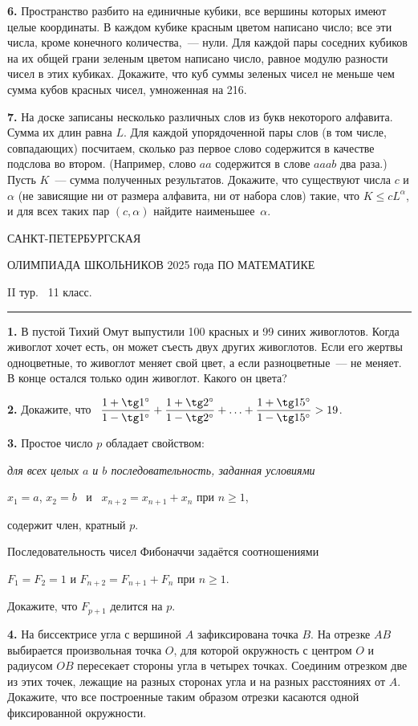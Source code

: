 \documentclass[12pt]{article}
\def\q#1.{{\bf #1. }}
\begin{document}
\q6. Пространство разбито на единичные кубики, все вершины которых имеют целые координаты. В каждом кубике красным
цветом написано число; все эти числа, кроме конечного количества,~--- нули. 
Для каждой пары соседних кубиков на их общей грани зеленым цветом
написано число, равное модулю разности чисел в этих кубиках. Докажите, что
куб суммы зеленых чисел не меньше чем сумма кубов красных чисел, умноженная на 216. 

\q7. На доске записаны несколько различных слов из букв некоторого алфавита.
Сумма их длин равна $L$. Для каждой упорядоченной пары слов (в том числе,
совпадающих) посчитаем, сколько раз первое слово содержится в качестве
подслова во втором. (Например, слово $aa$ содержится в слове $aaab$ два
раза.) Пусть $K$~--- сумма полученных результатов. Докажите, что
существуют числа $c$ и $\alpha$ (не зависящие ни от размера алфавита, ни
от набора слов) такие, что $K\leq cL^\alpha$, и для всех таких пар $(c,\alpha)$ найдите наименьшее~$\alpha$. 


\clearpage

\centerline{\sc САНКТ-ПЕТЕРБУРГСКАЯ}
\centerline{\sc ОЛИМПИАДА ШКОЛЬНИКОВ 2025 года ПО МАТЕМАТИКЕ}
\centerline{\sc II тур. \ 11 класс.}
\medskip
\hrule
\bigskip

\q1. В пустой Тихий Омут выпустили 100 красных и 99 синих живоглотов.
Когда живоглот хочет есть, он может съесть двух других живоглотов. Если
его жертвы одноцветные, то живоглот меняет свой цвет, а если разноцветные~--- не меняет. В конце остался только один живоглот. Какого он
цвета?

 
\q2. Докажите, что  \
$\displaystyle\frac{1+\tg 1^\circ}{1-\tg 1^\circ}+\frac{1+\tg 2^\circ}{1-\tg 2^\circ}+\ldots+ \frac{1+\tg 15^\circ}{1-\tg 15^\circ}>19$.

\q3. Простое число $p$ обладает свойством:

\smallskip
{\sl
для всех целых $a$ и $b$ последовательность, заданная условиями 

\centerline{$x_1=a$, $x_2=b$ \ и \ $x_{n+2}=x_{n+1}+x_n$ при $n\geq 1$,}

содержит член, кратный $p$.\par}

\smallskip
Последовательность чисел  Фибоначчи  задаётся соотношениями 

\centerline{$F_1=F_2=1$ и $F_{n+2}=F_{n+1}+F_n$ при $n\geq 1$.} 

Докажите, что $F_{p+1}$ делится на $p$.
 
\q4. На биссектрисе угла с вершиной $A$ зафиксирована точка $B$. На отрезке $AB$ выбирается произвольная точка $O$, для которой окружность с центром $O$ и радиусом $OB$ пересекает стороны угла в четырех
точках. Соединим отрезком две из этих точек, лежащие на разных сторонах
угла и на разных расстояниях от $A$. Докажите, что все построенные таким
образом отрезки касаются одной фиксированной окружности.
\end{document}
